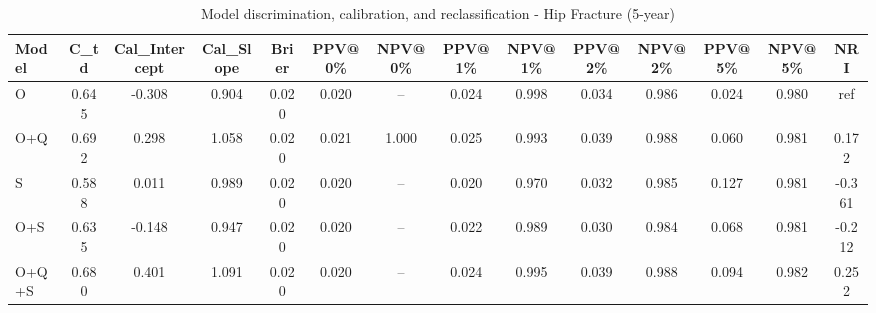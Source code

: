\begin{table}[htbp]
\centering
\small
\caption{Model discrimination, calibration, and reclassification - Hip Fracture (5-year)}
\label{tab:perf_pd_5y}
\begin{tabular}{lccccccccccccc}
\toprule
Model & C\_td & Cal\_Intercept & Cal\_Slope & Brier & PPV@0\% & NPV@0\% & PPV@1\% & NPV@1\% & PPV@2\% & NPV@2\% & PPV@5\% & NPV@5\% & NRI \\
\midrule
O & 0.645 & -0.308 & 0.904 & 0.020 & 0.020 & -- & 0.024 & 0.998 & 0.034 & 0.986 & 0.024 & 0.980 & ref \\
O+Q & 0.692 & 0.298 & 1.058 & 0.020 & 0.021 & 1.000 & 0.025 & 0.993 & 0.039 & 0.988 & 0.060 & 0.981 & 0.172 \\
S & 0.588 & 0.011 & 0.989 & 0.020 & 0.020 & -- & 0.020 & 0.970 & 0.032 & 0.985 & 0.127 & 0.981 & -0.361 \\
O+S & 0.635 & -0.148 & 0.947 & 0.020 & 0.020 & -- & 0.022 & 0.989 & 0.030 & 0.984 & 0.068 & 0.981 & -0.212 \\
O+Q+S & 0.680 & 0.401 & 1.091 & 0.020 & 0.020 & -- & 0.024 & 0.995 & 0.039 & 0.988 & 0.094 & 0.982 & 0.252 \\
\bottomrule
\end{tabular}
\end{table}